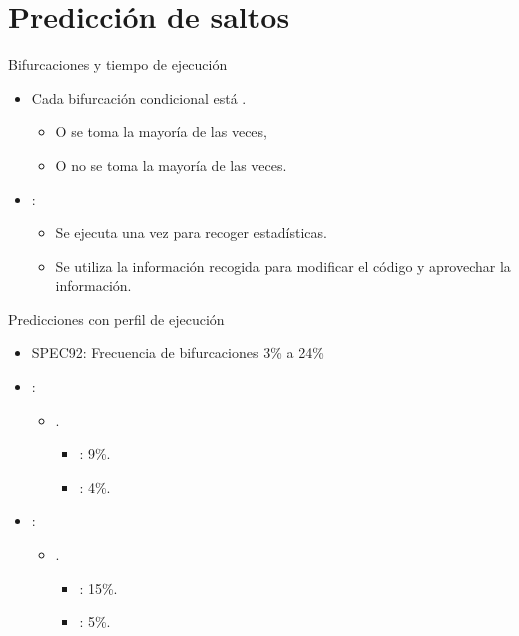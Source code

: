 \section{Predicción de saltos}

\begin{frame}[t]{Bifurcaciones y tiempo de ejecución}
\begin{itemize}
  \item Cada bifurcación condicional está .
    \begin{itemize}
      \item O se toma la mayoría de las veces,
      \item O no se toma la mayoría de las veces.
    \end{itemize}

  \item {}:
    \begin{itemize}
      \item Se ejecuta una vez para recoger estadísticas.
      \item Se utiliza la información recogida para modificar el código y aprovechar la información.
    \end{itemize}
\end{itemize}
\end{frame}

\begin{frame}[t]{Predicciones con perfil de ejecución}
\begin{itemize}
  \item SPEC92: Frecuencia de bifurcaciones 3\% a 24\%
  \item {}:
    \begin{itemize}
      \item {}. 
        \begin{itemize}
          \item {}: 9\%. 
          \item {}: 4\%.
        \end{itemize}
    \end{itemize}
  \item {}:
    \begin{itemize}
      \item {}. 
        \begin{itemize}
          \item {}: 15\%. 
          \item {}: 5\%.
        \end{itemize}
    \end{itemize}
\end{itemize}
\end{frame}

